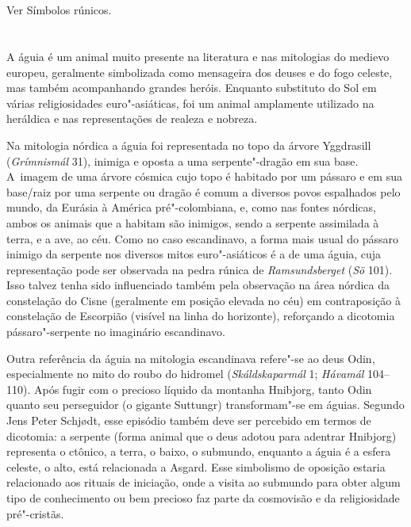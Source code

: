 \section{}

Ver Símbolos rúnicos.

\section{}

A águia é um animal muito presente na literatura e nas mitologias do
medievo europeu, geralmente simbolizada como mensageira dos deuses e do
fogo celeste, mas também acompanhando grandes heróis. Enquanto
substituto do Sol em várias religiosidades euro"-asiáticas, foi um animal
amplamente utilizado na heráldica e nas representações de realeza e
nobreza.

Na mitologia nórdica a águia foi representada no topo da árvore
Yggdrasill (\emph{Grímnismál} 31), inimiga e oposta a uma
serpente"-dragão em sua base. A~imagem de uma árvore cósmica cujo topo é
habitado por um pássaro e em sua base/raiz por uma serpente ou dragão é
comum a diversos povos espalhados pelo mundo, da Eurásia à América
pré"-colombiana, e, como nas fontes nórdicas, ambos os animais que a
habitam são inimigos, sendo a serpente assimilada à terra, e a ave, ao
céu. Como no caso escandinavo, a forma mais usual do pássaro inimigo da
serpente nos diversos mitos euro"-asiáticos é a de uma águia, cuja
representação pode ser observada na pedra rúnica de
\emph{Ramsundsberget} (\emph{Sö} 101). Isso talvez tenha sido influenciado
também pela observação na área nórdica da constelação do Cisne
(geralmente em posição elevada no céu) em contraposição à constelação de
Escorpião (visível na linha do horizonte), reforçando a dicotomia
pássaro"-serpente no imaginário escandinavo.


Outra referência da águia na mitologia escandinava refere"-se ao deus
Odin, especialmente no mito do roubo do hidromel (\emph{Skáldskaparmál}
1; \emph{Hávamál} 104--110). Após fugir com o precioso líquido da
montanha Hnibjorg, tanto Odin quanto seu perseguidor (o gigante
Suttungr) transformam"-se em águias. Segundo Jens Peter Schjødt, esse
episódio também deve ser percebido em termos de dicotomia: a serpente
(forma animal que o deus adotou para adentrar Hnibjorg) representa o
ctônico, a terra, o baixo, o submundo, enquanto a águia é a esfera
celeste, o alto, está relacionada a Asgard. Esse simbolismo de oposição
estaria relacionado aos rituais de iniciação, onde a visita ao submundo
para obter algum tipo de conhecimento ou bem precioso faz parte da
cosmovisão e da religiosidade pré"-cristãs.

